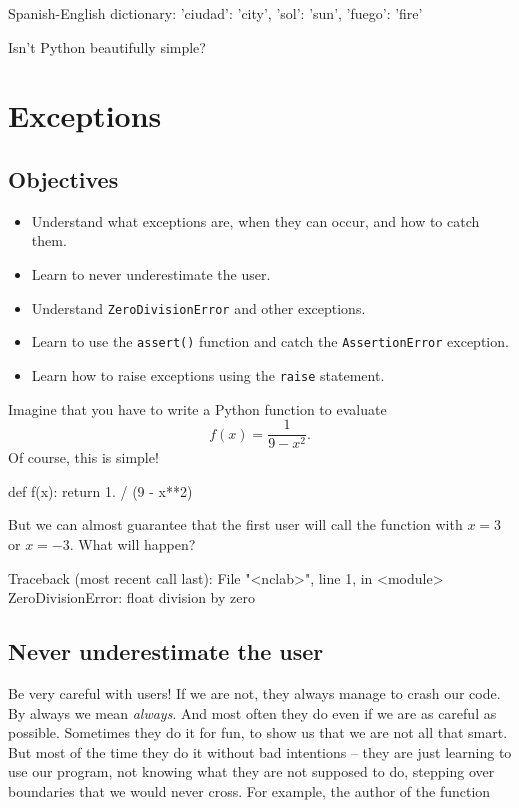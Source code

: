\begin{greencode}
Spanish-English dictionary:
{'ciudad': 'city', 'sol': 'sun', 'fuego': 'fire'}
\end{greencode}
Isn't Python beautifully simple?



\section{Exceptions}

\subsection{Objectives}

\begin{itemize}
\item Understand what exceptions are, when they can occur, and how to catch them.
\item Learn to never underestimate the user.
\item Understand {\tt ZeroDivisionError} and other exceptions.
\item Learn to use the {\tt assert()} function and catch the {\tt AssertionError} exception.
\item Learn how to raise exceptions using the {\tt raise} statement.
\end{itemize}
Imagine that you have to write a Python function to evaluate
$$
f(x) = \frac{1}{9 - x^2}.
$$
Of course, this is simple!

\begin{bluecode}
def f(x):
    return 1. / (9 - x**2)
\end{bluecode}
But we can almost guarantee that the first user will call the 
function with $x = 3$ or $x = -3$. What will happen?

\begin{redcode}
Traceback (most recent call last):
  File "<nclab>", line 1, in <module>
ZeroDivisionError: float division by zero
\end{redcode}

\subsection{Never underestimate the user}

Be very careful with users! If we are not, they always manage
to crash our code. By always we mean {\em always}. And most often they do even
if we are as careful as possible. Sometimes they do it for fun, to show us that we are not all that smart.
But most of the time they do it without bad intentions -- they are just learning to use our
program, not knowing what they are not supposed to do, stepping over boundaries that we would 
never cross. For example, the author of the function 

